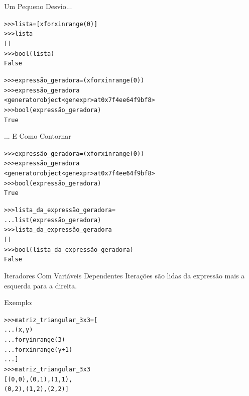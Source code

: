 \documentclass[11pt]{beamer}
\begin{document}
\begin{frame}[fragile]{Um Pequeno Desvio...}
  \begin{alltt}\small
>>> lista = [x for x in range(0)]
>>> lista
[]
>>> bool(lista)
False

>>> expressão_geradora = (x for x in range(0))
>>> expressão_geradora
<generator object <genexpr> at 0x7f4ee64f9bf8>
>>> bool(expressão_geradora)
True
\end{alltt}
\end{frame}

\begin{frame}[fragile]{... E Como Contornar}
  \begin{alltt}\small
>>> expressão_geradora = (x for x in range(0))
>>> expressão_geradora
<generator object <genexpr> at 0x7f4ee64f9bf8>
>>> bool(expressão_geradora)
True

>>> lista_da_expressão_geradora =
...     list(expressão_geradora)
>>> lista_da_expressão_geradora
[]
>>> bool(lista_da_expressão_geradora)
False
\end{alltt}
\end{frame}

\begin{frame}[fragile]{Iteradores Com Variáveis Dependentes}
  Iterações são lidas da expressão mais a esquerda para a direita.

\vfill

\begin{minipage}{0.4\linewidth}
  Exemplo:
  \begin{alltt}\footnotesize
>>> matriz_triangular_3x3 = [
...     (x, y)
...     for y in range(3)
...     for x in range(y+1)
... ]
>>> matriz_triangular_3x3
[(0, 0), (0, 1), (1, 1),
 (0, 2), (1, 2), (2, 2)]
\end{alltt}
\end{minipage}
\hfill
\begin{minipage}{0.4\linewidth}
\end{minipage}
\end{frame}
\end{document}
